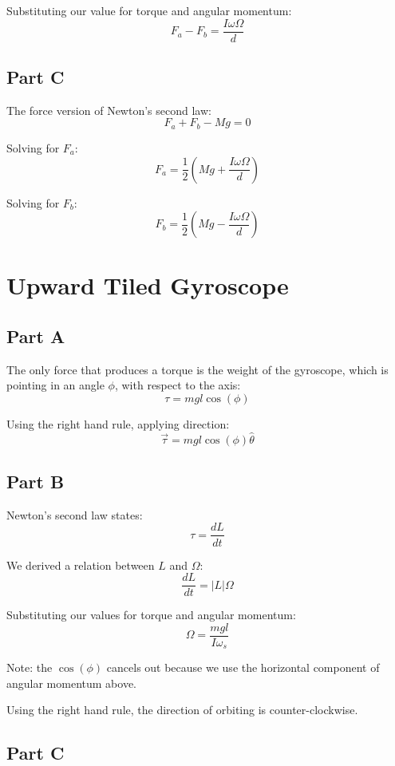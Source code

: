 \documentclass{article}
\begin{document}
Substituting our value for torque and angular momentum:
$$ F_{a} - F_{b} = \frac{ I \omega \Omega }{ d } $$

\subsection*{ Part C }

The force version of Newton's second law:
$$ F_{a} + F_{b} - Mg = 0 $$

Solving for $F_{a}$:
$$ F_{a} = \frac{ 1 }{ 2 } \left( Mg + \frac{ I \omega \Omega }{ d } \right) $$

Solving for $F_{b}$:
$$ F_{b} = \frac{ 1 }{ 2 } \left( Mg - \frac{ I \omega \Omega }{ d } \right) $$

\section{ Upward Tiled Gyroscope }

\subsection*{ Part A }

The only force that produces a torque is the weight of the gyroscope, which is
pointing in an angle $\phi$, with respect to the axis:
$$ \tau = mgl \cos( \phi ) $$

Using the right hand rule, applying direction:
$$ \vec{ \tau } = mgl \cos( \phi ) \hat{ \theta } $$

\subsection*{ Part B }

Newton's second law states:
$$ \tau = \frac{ dL }{ dt } $$

We derived a relation between $L$ and $\Omega$:
$$ \frac{ dL }{ dt } = \vert L \vert \Omega $$

Substituting our values for torque and angular momentum:
$$ \Omega = \frac{ mgl }{ I \omega_{s} } $$

Note: the $\cos( \phi )$ cancels out because we use the horizontal component of
angular momentum above.

Using the right hand rule, the direction of orbiting is counter-clockwise.

\subsection*{ Part C }
\end{document}
